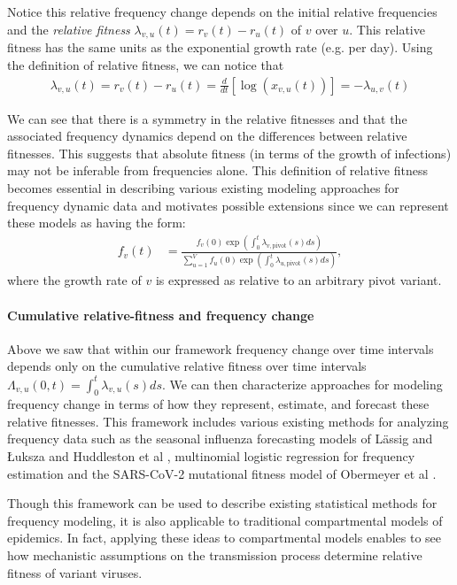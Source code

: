\documentclass[12pt,oneside,letterpaper]{article}
\begin{document}
Notice this relative frequency change depends on the initial relative frequencies and the \emph{relative fitness} $\lambda_{v,u}(t) = r_{v}(t) - r_{u}(t)$ of $v$ over $u$.
This relative fitness has the same units as the exponential growth rate (e.g. per day).
Using the definition of relative fitness, we can notice that
\begin{align}
\lambda_{v, u}(t) = r_{v}(t) - r_{u}(t) = \frac{d }{d t} \left[\log \left( x_{v,u}(t) \right) \right] = - \lambda_{u,v}(t)
\end{align}

We can see that there is a symmetry in the relative fitnesses and that the associated frequency dynamics depend on the differences between relative fitnesses.
This suggests that absolute fitness (in terms of the growth of infections) may not be inferable from frequencies alone.
This definition of relative fitness becomes essential in describing various existing modeling approaches for frequency dynamic data and motivates possible extensions since we can represent these models as having the form:
\begin{align}
    f_{v}(t) &= \frac{ f_{v}(0) \exp( \int_{0}^{t} \lambda_{v, \text{pivot}}(s) ds)}{\sum_{u=1}^{V}  f_{u}(0) \exp( \int_{0}^{t} \lambda_{u, \text{pivot}}(s) ds)},
\end{align}
where the growth rate of $v$ is expressed as relative to an arbitrary pivot variant.

\paragraph{Cumulative relative-fitness and frequency change}

Above we saw that within our framework frequency change over time intervals depends only on the cumulative relative fitness over time intervals $\Lambda_{v,u}(0, t) = \int_{0}^{t} \lambda_{v, u}(s)ds$.
We can then characterize approaches for modeling frequency change in terms of how they represent, estimate, and forecast these relative fitnesses.
This framework includes various existing methods for analyzing frequency data such as the seasonal influenza forecasting models of L{\"a}ssig and {\L}uksza \cite{luksza2014predictive} and Huddleston et al \cite{Huddleston2020}, multinomial logistic regression for frequency estimation \cite{Annavajhala2021} and the SARS-CoV-2 mutational fitness model of Obermeyer et al \cite{Obermeyer2022}.

Though this framework can be used to describe existing statistical methods for frequency modeling, it is also applicable to traditional compartmental models of epidemics.
In fact, applying these ideas to compartmental models enables to see how mechanistic assumptions on the transmission process determine relative fitness of variant viruses.
\end{document}
